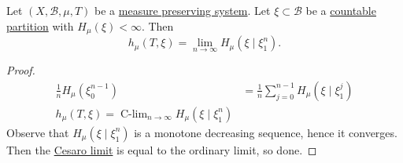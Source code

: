 \documentclass{article}
\DeclareMathOperator*{\clim}{C-lim}
\newcommand{\B}{\mathcal{B}}
\begin{document}
\begin{lemma}
  Let $(X, \mathcal{B}, \mu, T)$ be a \hyperlink{def:mps}{measure preserving system}.
  Let $\xi \subset \B$ be a \hyperlink{def:partition}{countable partition} with $H_\mu(\xi) < \infty$.
  Then
  \begin{equation*}
    h_\mu(T, \xi) = \lim_{n \to \infty} H_\mu(\xi \mid \xi_1^n).
  \end{equation*}
\end{lemma}
\begin{proof}
  \begin{align*}
    \frac{1}{n} H_\mu(\xi_0^{n-1}) &= \frac{1}{n} \sum_{j=0}^{n-1} H_\mu(\xi \mid \xi_1^j) \\
    h_\mu(T,\xi) = \clim_{n \to \infty} H_\mu(\xi \mid \xi_1^n)
  \end{align*}
  Observe that $H_\mu(\xi \mid \xi_1^n)$ is a monotone decreasing sequence, hence it converges.
  Then the \hyperlink{def:cesaro}{Cesaro limit} is equal to the ordinary limit, so done.
\end{proof}
\end{document}
